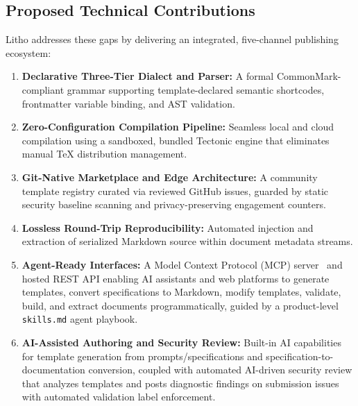 \subsection{Proposed Technical Contributions}
Litho addresses these gaps by delivering an integrated, five-channel publishing ecosystem:
\begin{enumerate}[leftmargin=*]
  \item \textbf{Declarative Three-Tier Dialect and Parser:} A formal CommonMark-compliant grammar supporting template-declared semantic shortcodes, frontmatter variable binding, and AST validation.
  \item \textbf{Zero-Configuration Compilation Pipeline:} Seamless local and cloud compilation using a sandboxed, bundled Tectonic engine that eliminates manual TeX distribution management.
  \item \textbf{Git-Native Marketplace and Edge Architecture:} A community template registry curated via reviewed GitHub issues, guarded by static security baseline scanning and privacy-preserving engagement counters.
  \item \textbf{Lossless Round-Trip Reproducibility:} Automated injection and extraction of serialized Markdown source within document metadata streams.
  \item \textbf{Agent-Ready Interfaces:} A Model Context Protocol (MCP) server~\cite{anthropic2024mcp} and hosted REST API enabling AI assistants and web platforms to generate templates, convert specifications to Markdown, modify templates, validate, build, and extract documents programmatically, guided by a product-level \texttt{skills.md} agent playbook.
  \item \textbf{AI-Assisted Authoring and Security Review:} Built-in AI capabilities for template generation from prompts/specifications and specification-to-documentation conversion, coupled with automated AI-driven security review that analyzes templates and posts diagnostic findings on submission issues with automated validation label enforcement.
\end{enumerate}

